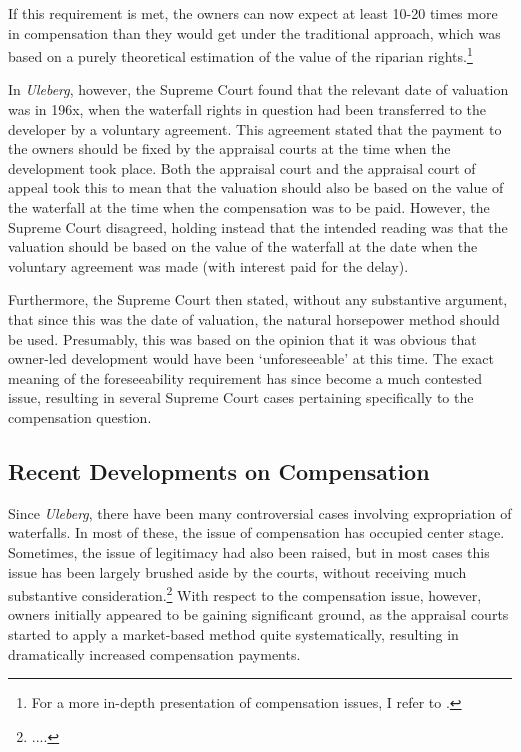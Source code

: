 If this requirement is met, the owners can now expect at least 10-20 times more in compensation than they would get under the traditional approach, which was based on a purely theoretical estimation of the value of the riparian rights.\footnote{For a more in-depth presentation of compensation issues, I refer to \cite[71-76]{dyrkolbotn15}.} 

In {\it Uleberg}, however, the Supreme Court found that the relevant date of valuation was in 196x, when the waterfall rights in question had been transferred to the developer by a voluntary agreement. This agreement stated that the payment to the owners should be fixed by the appraisal courts at the time when the development took place. Both the appraisal court and the appraisal court of appeal took this to mean that the valuation should also be based on the value of the waterfall at the time when the compensation was to be paid. However, the Supreme Court disagreed, holding instead that the intended reading was that the valuation should be based on the value of the waterfall at the date when the voluntary agreement was made (with interest paid for the delay).

Furthermore, the Supreme Court then stated, without any substantive argument, that since this was the date of valuation, the natural horsepower method should be used. Presumably, this was based on the opinion that it was obvious that owner-led development would have been `unforeseeable' at this time. The exact meaning of the foreseeability requirement has since become a much contested issue, resulting in several Supreme Court cases pertaining specifically to the compensation question.

\subsection{Recent Developments on Compensation}

Since {\it Uleberg}, there have been many controversial cases involving expropriation of waterfalls.  In most of these, the issue of compensation has occupied center stage. Sometimes, the issue of legitimacy had also been raised, but in most cases this issue has been largely brushed aside by the courts, without receiving much substantive consideration.\footnote{....} With respect to the compensation issue, however, owners initially appeared to be gaining significant ground, as the appraisal courts started to apply a market-based method quite systematically, resulting in dramatically increased compensation payments. 


